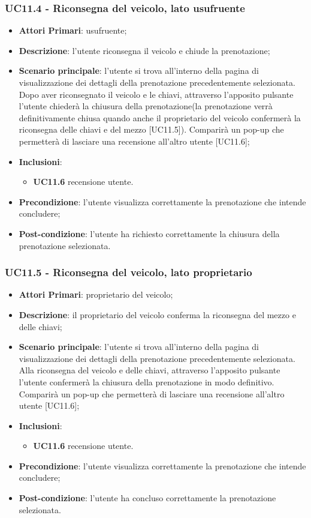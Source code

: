 \subsubsection{UC11.4 - Riconsegna del veicolo, lato usufruente}
\begin{itemize}
	\item \textbf{Attori Primari}: usufruente;
	\item \textbf{Descrizione}: l'utente riconsegna il veicolo e chiude la prenotazione;
	\item \textbf{Scenario principale}: l'utente si trova all'interno della pagina di visualizzazione dei dettagli della prenotazione precedentemente selezionata. Dopo aver riconsegnato il veicolo e le chiavi, attraverso l'apposito pulsante l'utente chiederà la chiusura della prenotazione(la prenotazione verrà definitivamente chiusa quando anche il proprietario del veicolo confermerà la riconsegna delle chiavi e del mezzo [UC11.5]). Comparirà un pop-up che permetterà di lasciare una recensione all'altro utente [UC11.6];
	\item \textbf{Inclusioni}: 
	\begin{itemize}
		\item \textbf{UC11.6} recensione utente.
	\end{itemize}
	\item \textbf{Precondizione}: l'utente visualizza correttamente la prenotazione che intende concludere;
	\item \textbf{Post-condizione}: l'utente ha richiesto correttamente la chiusura della prenotazione selezionata.
	
\end{itemize}

\subsubsection{UC11.5 - Riconsegna del veicolo, lato proprietario}
\begin{itemize}
	\item \textbf{Attori Primari}: proprietario del veicolo;
	\item \textbf{Descrizione}: il proprietario del veicolo conferma la riconsegna del mezzo e delle chiavi;
	\item \textbf{Scenario principale}: l'utente si trova all'interno della pagina di visualizzazione dei dettagli della prenotazione precedentemente selezionata. Alla riconsegna del veicolo e delle chiavi, attraverso l'apposito pulsante l'utente confermerà la chiusura della prenotazione in modo definitivo. Comparirà un pop-up che permetterà di lasciare una recensione all'altro utente [UC11.6];
	\item \textbf{Inclusioni}: 
	\begin{itemize}
		\item \textbf{UC11.6} recensione utente.
	\end{itemize}
	\item \textbf{Precondizione}: l'utente visualizza correttamente la prenotazione che intende concludere;
	\item \textbf{Post-condizione}: l'utente ha concluso correttamente la prenotazione selezionata.
\end{itemize}


